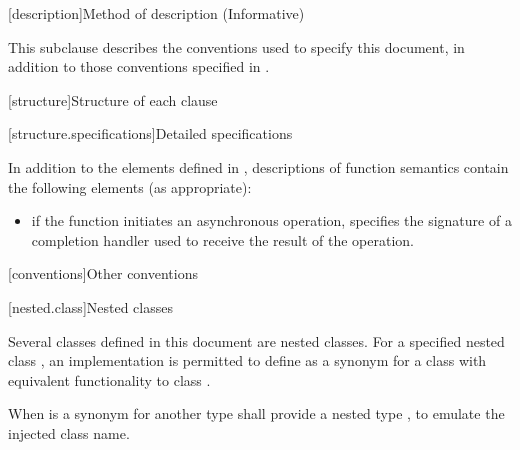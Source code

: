 
[description]{Method of description (Informative)}

\pnum
 This subclause describes the conventions used to specify this document, in addition to those conventions specified in .


[structure]{Structure of each clause}


[structure.specifications]{Detailed specifications}

\pnum
In addition to the elements defined in , descriptions of function semantics contain the following elements (as appropriate):

\begin{itemize}
\item
\completionsig if the function initiates an asynchronous operation, specifies the signature of a completion handler used to receive the result of the operation.
\end{itemize}




[conventions]{Other conventions}


[nested.class]{Nested classes}

\pnum
Several classes defined in this document are nested classes.
For a specified nested class , an implementation is permitted to
define  as a synonym for a class with equivalent functionality to
class . \begin{note} When  is a synonym for another
type  shall provide a nested type , to emulate the injected
class name. \end{note}


